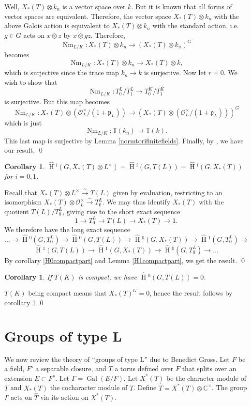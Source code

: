\documentclass[11pt]{amsart}
\theoremstyle{plain}
\newtheorem{corollary}[theorem]{Corollary}
\newcommand{\HT}[1]{\hat{\HH}{}^{#1}}
\theoremstyle{definition}
\DeclareMathOperator{\Gal}{Gal}
\DeclareMathOperator{\HH}{H}
\DeclareMathOperator{\Nm}{Nm}
\begin{document}
Well, $X_*(T) \otimes k_n$ is a vector space over
$k$.  But it is known that all forms of vector spaces are
equivalent.  Therefore, the vector space $X_*(T) \otimes k_n$
with the above Galois action is equivalent to $X_*(T) \otimes k_n$
with the standard action, i.e. $g \in G$ acts on $x \otimes z$ by
$x \otimes gz$.  Therefore,
$$\Nm_{L/K} : X_*(T) \otimes k_n \rightarrow (X_*(T) \otimes k_n)^G$$
becomes
$$\Nm_{L/K} : X_*(T) \otimes k_n \rightarrow X_*(T) \otimes k,$$
which is surjective since the trace map $k_n \rightarrow k$
is surjective.  Now let $r = 0$.  We wish to show that
$$\Nm_{L/K} : T_0^L / T_1^L \rightarrow T_0^K / T_1^K$$
is surjective.  But this map becomes
$$\Nm_{L/K} : X_*(T) \otimes \left( \mathcal{O}_L^\times / (1 + \mathfrak{p}_L) \right) \rightarrow (X_*(T) \otimes \left( \mathcal{O}_L^\times / (1 + \mathfrak{p}_L) \right) )^G$$
which is just
$$\Nm_{L/K} : \mathbb{T}(k_n) \rightarrow \mathbb{T}(k).$$
This last map is surjective by Lemma \ref{normtorifinitefields}.
Finally, by \cite[Lemma 2, p. 81]{serre}, we have our result.
\qed

\begin{corollary}\label{reductiontori}
$\HT{i}(G, X_*(T) \otimes L^\times) = \HT{i}(G, T(L)) = \HT{i}(G,X_*(T))$ for $i=0,1$.
\end{corollary}

\proof

Recall that $X_*(T) \otimes L^\times \xrightarrow{\sim} T(L)$ given by
evaluation, restricting to an isomorphism $X_*(T) \otimes \mathcal{O}_L^\times
\xrightarrow{\sim} T_0^L$.  We may thus identify $X_*(T)$ with the quotient
$T(L) / T_0^L$, giving rise to the short exact sequence
$$1 \rightarrow T_0^L \rightarrow T(L) \rightarrow X_*(T) \rightarrow 1.$$
We therefore have the long exact sequence
$$... \rightarrow \HT{0}(G, T_0^L) \rightarrow \HT{0}(G, T(L)) \rightarrow \HT{0}(G, X_*(T))
\rightarrow \HT{1}(G, T_0^L) \rightarrow $$ $$\HT{1}(G, T(L))
\rightarrow \HT{1}(G, X_*(T)) \rightarrow \HT{0}(G, T_0^L)
\rightarrow ...$$
By corollary \ref{H0compactpart} and Lemma \ref{H1compactpart}, we get the result.
\qed

\begin{corollary}\label{trivialh0compacttori}
If $T(K)$ is compact, we have $\HT{0}(G, T(L)) = 0$.
\end{corollary}

\proof
$T(K)$ being compact means that $X_*(T)^G = 0$, hence the result follows by corollary \ref{reductiontori}
\qed

\section{Groups of type L}\label{groupsoftypeL}
We now review the theory of ``groups of type L'' due to Benedict
Gross.  Let $F$ be a field, $F^{\mathrm s}$ a separable closure, and
$T$ a torus defined over $F$ that splits over an extension $E \subset
F^s$.  Let $\Gamma = \Gal(E/F)$.  Let $X^*(T)$ be the character module
of $T$ and $X_*(T)$ the cocharacter module of $T$.  Define
$\hat{T} = X^*(T) \otimes \mathbb{C}^\times$.  The group $\Gamma$ acts on
$\hat{T}$ via its action on $X^*(T)$.
\end{document}
